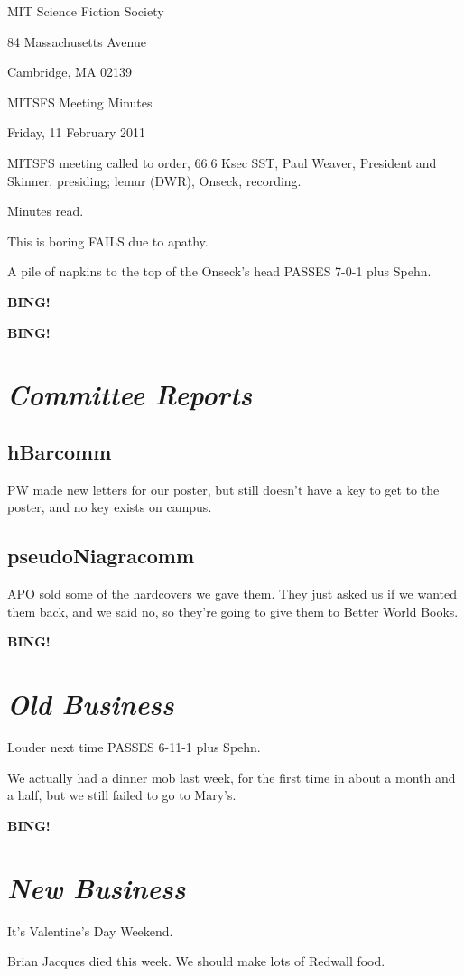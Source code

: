 \documentclass[10pt]{article}
\newcommand{\bing}{{\bf BING!} }
\newcommand{\goto}[1]{\bing \vskip 12pt \section*{{\em{#1}}}}
\newcommand{\ps}{ plus Spehn\xspace}
\newcommand{\skinner}{Paul Weaver, President and Skinner}
\newcommand{\onseck}{lemur (DWR), Onseck}
\newcommand{\meetingdate}{Friday, 11 February 2011}
\begin{document}
\begin{center}

MIT Science Fiction Society

84 Massachusetts Avenue

Cambridge, MA 02139

\vspace{12pt}

MITSFS Meeting Minutes

\meetingdate

\end{center}

\vspace{18pt}

\setlength{\parskip}{6pt}

\noindent
MITSFS meeting called to order, 66.6 Ksec SST,
\skinner, presiding; \onseck, recording.

Minutes read.

This is boring FAILS due to apathy.

A pile of napkins to the top of the Onseck's head PASSES 7-0-1\ps.

\bing

\goto{Committee Reports}

\subsection*{hBarcomm}

PW made new letters for our poster, but still doesn't have a key to get
to the poster, and no key exists on campus.

\subsection*{pseudoNiagracomm}

APO sold some of the hardcovers we gave them.  They just asked us if
we wanted them back, and we said no, so they're going to give them
to Better World Books.


\goto{Old Business}

Louder next time PASSES 6-11-1\ps.

We actually had a dinner mob last week, for the first time in about
a month and a half, but we still failed to go to Mary's.


\goto{New Business}

It's Valentine's Day Weekend.

Brian Jacques died this week.  We should make lots of Redwall food.
\end{document}
